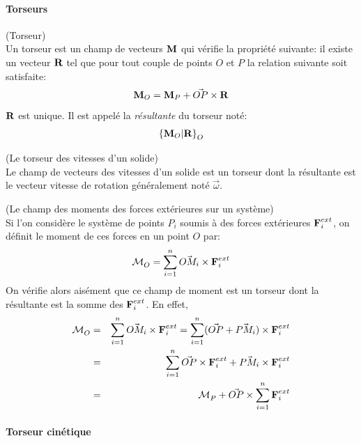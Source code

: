 \paragraph{Torseurs}

\begin{mydef} (Torseur)\\
  Un torseur est un champ de vecteurs $\textbf{M}$ qui vérifie la propriété
  suivante: il existe un vecteur $\textbf{R}$ tel que pour tout couple de
  points $O$ et $P$ la relation suivante soit satisfaite:
  $$
  \textbf{M}_O = \textbf{M}_P + \vec{OP} \times \textbf{R}
  $$
  $\textbf{R}$ est unique. Il est appelé la {\em résultante} du torseur
  noté:
  $$
  \left\{\textbf{M}_O|\textbf{R}\right\}_{O}
  $$
\end{mydef}

\begin{myexample} (Le torseur des vitesses d'un solide)\\
  Le champ de vecteurs des vitesses d'un solide est un torseur dont la
  résultante est le vecteur vitesse de rotation généralement noté
  $\vec{\omega}$.
\end{myexample}

\begin{myexample} (Le champ des moments des forces extérieures sur un système)\\
  Si l'on considère le système de points $P_i$ soumis à des forces
  extérieures $\textbf{F}_i^{ext}$, on définit le moment de ces forces en
  un point $O$ par:
  $$
  {\cal M}_{O}^{} = \sum_{i=1}^{n} \vec{OM_i}\times \textbf{F}_i^{ext}
  $$
  On vérifie alors aisément que ce champ de moment est un torseur dont
  la résultante est la somme des $\textbf{F}_i^{ext}$. En
  effet,
  \begin{eqnarray*}
    {\cal M}_{O}^{} &=& \sum_{i=1}^{n} \vec{OM_i}\times \textbf{F}_i^{ext}
    =\sum_{i=1}^{n} (\vec{OP}+\vec{PM_i})\times \textbf{F}_i^{ext} \\
    &=& \sum_{i=1}^{n} \vec{OP}\times \textbf{F}_i^{ext} +
    \vec{PM_i}\times \textbf{F}_i^{ext} \\
    &=& {\cal M}_{P}^{} + \vec{OP} \times \sum_{i=1}^{n} \textbf{F}_i^{ext}
  \end{eqnarray*}
\end{myexample}


\paragraph{Torseur cinétique}

